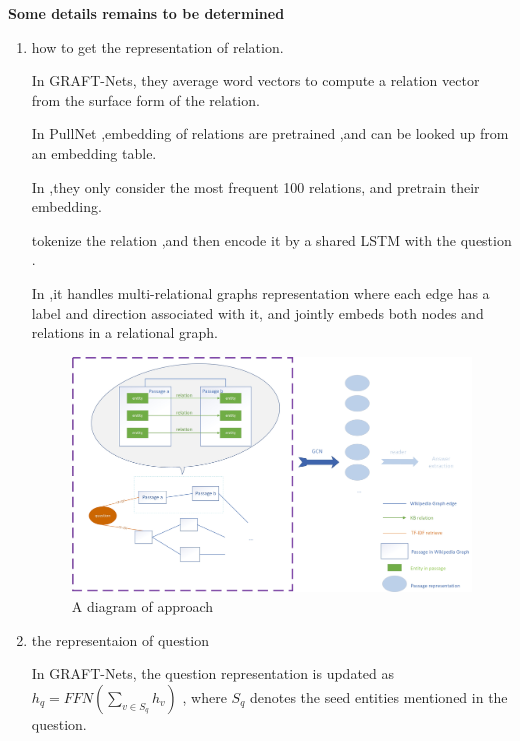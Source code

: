 \documentclass[sigconf]{acmart}
\begin{document}
   	\textbf{Some details remains to be determined}
   	
   	\begin{enumerate}[(1)]
   		
   	\item how to get the representation of relation.
   	
	   	In GRAFT-Nets\cite{sun2018open}, they average word
	   	vectors to compute a relation vector  from the
	   	surface form of the relation.
	   	
	   	In PullNet\cite{sun2019pullnet} ,embedding of  relations are pretrained ,and can be looked up from an embedding table.
	   	
	   	In \cite{min2019knowledge} ,they only consider the most frequent 100 relations, and pretrain their embedding.	
	   	
	   	 \cite{xiong2019improving} tokenize the relation ,and then  encode it by a shared LSTM with the question .
	   
	   	
	   	In \cite{2020Composition},it handles multi-relational graphs  representation where each edge has a label and direction associated with it, and jointly embeds both nodes and relations in a relational graph.
	   	
	   	\begin{figure}[ht]		
	   		\centering
	   		\includegraphics[scale=0.5]{f1.jpg}
	   		\caption{A diagram of approach}
	   		\label{fig:label}
	   	\end{figure}
	   	
   	
   	\item the representaion of question
   	
   		In GRAFT-Nets\cite{sun2018open},
   		the question representation is updated as
   		$h_q = FFN(\sum_{v\in S_q}h_v)$
   		, where $S_q$ denotes the seed entities mentioned in the question.
   		

\end{enumerate}
\end{document}
